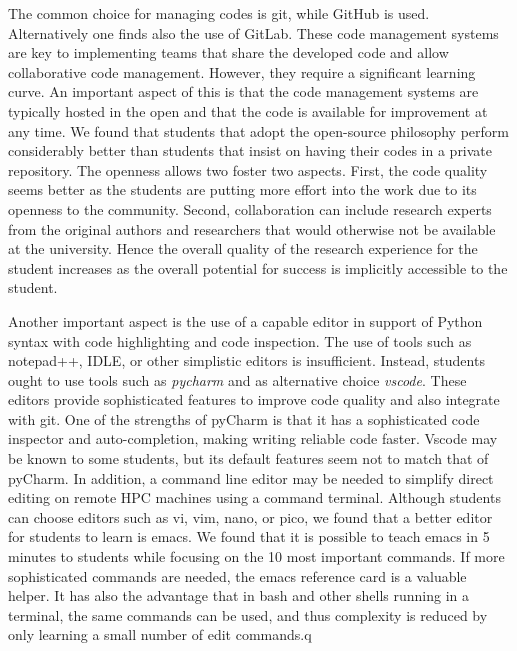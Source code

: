 \documentclass[utf8]{FrontiersinVancouver} %
\begin{document}
The common choice for managing codes is git, while GitHub is used.
Alternatively one finds also the use of GitLab.  These code management
systems are key to implementing teams that share the developed code
and allow collaborative code management.  However, they require a
significant learning curve. An important aspect of this is that the
code management systems are typically hosted in the open and that the
code is available for improvement at any time. We found that students
that adopt the open-source philosophy perform considerably better than
students that insist on having their codes in a private
repository. The openness allows two foster two aspects. First, the
code quality seems better as the students are putting more effort into
the work due to its openness to the community. Second, collaboration
can include research experts from the original authors and researchers
that would otherwise not be available at the university. Hence the
overall quality of the research experience for the student increases
as the overall potential for success is implicitly accessible to the
student.

Another important aspect is the use of a capable editor in support of
Python syntax with code highlighting and code inspection. The use of
tools such as notepad++, IDLE, or other simplistic editors is
insufficient. Instead, students ought to use tools such as {\em
  pycharm} and as alternative choice {\em vscode}. These editors
provide sophisticated features to improve code quality and also
integrate with git. One of the strengths of pyCharm is that it has a
sophisticated code inspector and auto-completion, making writing
reliable code faster. Vscode may be known to some students, but its
default features seem not to match that of pyCharm. In addition, a
command line editor may be needed to simplify direct editing on remote
HPC machines using a command terminal. Although students can choose
editors such as vi, vim, nano, or pico, we found that a better editor
for students to learn is emacs. We found that it is possible to teach
emacs in 5 minutes to students while focusing on the 10 most important
commands. If more sophisticated commands are needed, the emacs
reference card is a valuable helper. It has also the advantage that in
bash and other shells running in a terminal, the same commands can be
used, and thus complexity is reduced by only learning a small number
of edit commands.q
\end{document}
